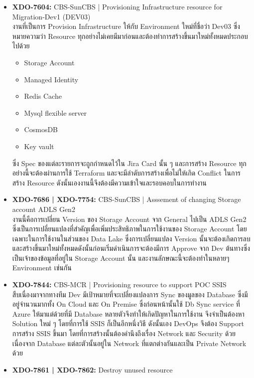 \begin{itemize}
      \item \textbf{XDO-7604:} CBS-SunCBS | Provisioning Infrastructure resource for Migration-Dev1 (DEV03)\\
            งานที่เป็นการ Provision Infrastructure ให้กับ Environment ใหม่ที่ชื่อว่า Dev03 ซึ่งหมายความว่า Resource ทุกอย่างไม่เคยมีมาก่อนและต้องทำการสร้างขึ้นมาใหม่ทั้งหมดประกอบไปด้วย
            \begin{itemize}
                  \item Storage Account
                  \item Managed Identity
                  \item Redis Cache
                  \item Mysql flexible server
                  \item CosmosDB
                  \item Key vault
            \end{itemize}
            ซึ่ง Spec ของแต่ละรายการจะถูกกำหนดไว้ใน Jira Card นั้น ๆ และการสร้าง Resource ทุกอย่างนี้จะต้องผ่านการใช้ Terraform และจะมีลำดับการสร้างเพื่อไม่ให้เกิด Conflict ในการสร้าง Resource ดังนั้นเองงานนี้จึงต้องมีความเข้าใจและรอบคอบในการทำงาน
      \item \textbf{XDO-7686 | XDO-7754:} CBS-SunCBS | Asssement of changing Storage account ADLS Gen2\\
            งานนี้คือการเปลี่ยน Version ของ Storage Account จาก General ไปเป็น ADLS Gen2 ซึ่งเป็นการเปลี่ยนแปลงที่สำคัญเพื่อเพิ่มประสิทธิภาพในการใช้งานของ Storage Account โดยเฉพาะในการใช้งานในส่วนของ Data Lake ซึ่งการเปลี่ยนแปลง Version นั้นจะต้องเกิดการลบและสร้างขึ้นมาใหม่ทั้งหมดดังนั้นก่อนเริ่มดำเนินการจะต้องมีการ Approve จาก Dev ต้นทางซึ่งเป็นเจ้าของข้อมูลที่อยู่ใน Storage Account นั้น และงานลักษณะนี้จะต้องทำในหลายๆ Environment เช่นกัน
      \item \textbf{XDO-7844:} CBS-MCR | Provisioning resource to support POC SSIS\\
            สืบเนื่องมาจากทางทีม Dev มีเป้าหมายที่จะเปลี่ยงแปลงการ Sync ของมูลของ Database ซึ่งมีอยู่จำนวนมากทั้ง On Cloud และ On Premise ซึ่งก่อนหน้านั้นใช้ Db Sync service ที่ Azure ให้มาแต่ด้วยที่มี Database หลายตัวจึงทำให้เกิดปัญหาในการใช้งาน จึงจำเป็นต้องหา Solution ใหม่ ๆ โดยที่การใช้ SSIS ก็เป็นอีกหนึ่งวิธี ดังนั้นเอง DevOps จึงต้อง Support การสร้าง SSIS ขึ้นมา โดยที่การสร้างนั้นต้องคำนึงถึงเรื่อง Network และ Security ด้วยเนื่องจาก Database แต่ละตัวนั้นอยู่ใน Network ที่แตกต่างกันและเป็น Private Network ด้วย
      \clearpage
      \item \textbf{XDO-7861 | XDO-7862: } Destroy unused resource\\

\end{itemize}
